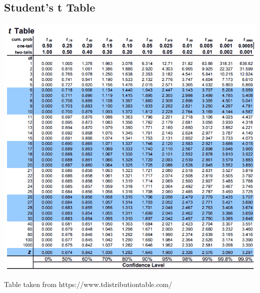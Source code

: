 \documentclass[12pt,letterpaper]{article} \usepackage{amsmath} \usepackage{graphicx} \usepackage[margin=1in]{geometry} \usepackage{longtable}  \usepackage{amssymb}
\begin{document}
	\subsection{Student's t Table}
	\begin{center}
		\includegraphics[width=0.99\linewidth]{t-table}
	\end{center}
	Table taken from https://www.tdistributiontable.com/
	
	
\end{document}
